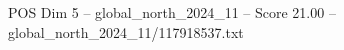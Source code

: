 \begin{textsample}{POS Dim 5 – global\_north\_2024\_11 – Score 21.00 – global\_north\_2024\_11/117918537.txt}
\end{textsample}

